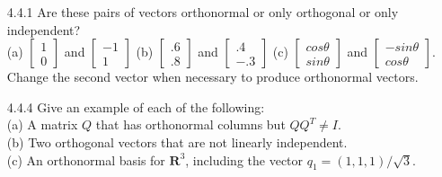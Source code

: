 \documentclass[10pt,twoside,reqno]{article}
\begin{document}
\begin{enumerate}
\item[4.4.1] Are these pairs of vectors orthonormal or only orthogonal or only independent?\\
\vspace{2mm}
(a) $\left[\begin{smallmatrix} 1\\ 0 \end{smallmatrix} \right]$ and $\left[\begin{smallmatrix} -1\\ 1 \end{smallmatrix} \right]$ \hspace{3mm} (b) $\left[\begin{smallmatrix} .6\\ .8 \end{smallmatrix} \right]$ and $\left[\begin{smallmatrix} .4\\ -.3 \end{smallmatrix} \right]$ \hspace{3mm} (c) $\left[\begin{smallmatrix} cos\theta\\ sin\theta \end{smallmatrix} \right]$ and $\left[\begin{smallmatrix} -sin\theta\\ cos\theta \end{smallmatrix} \right]$.\\
\vspace{2mm}
Change the second vector when necessary to produce orthonormal vectors.\\
\vspace{3mm}

\vspace{3mm}
\item[4.4.4] Give an example of each of the following:\\
(a) A matrix $Q$ that has orthonormal columns but $QQ^T \neq I$.\\
(b) Two orthogonal vectors that are not linearly independent.\\
(c) An orthonormal basis for $\pmb{R}^3$, including the vector $q_1 = (1, 1, 1)/\sqrt{3}$.\\
\vspace{3mm}


\end{enumerate}
\end{document}
